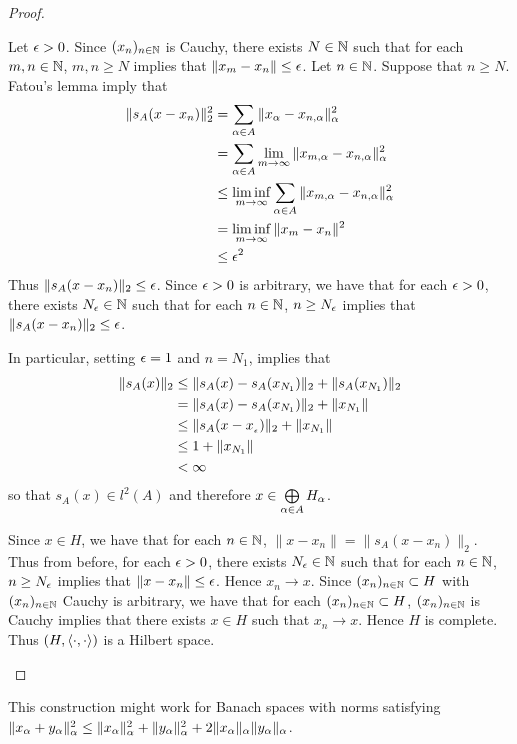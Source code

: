 \documentclass{book}
\begin{document}
\begin{proof}
\begin{enumerate}
		Let $\epsilon > 0$. Since $(x_n)_{n \in \mathbb{N}}$ is Cauchy, there exists $N \in \mathbb{N}$ such that for each $m,n \in \mathbb{N}$, $m,n \geq N$ implies that $\|x_m - x_n\| \leq \epsilon$. Let $n \in \mathbb{N}$. Suppose that $n \geq N$. Fatou's lemma imply that
		\begin{align*}
			\|s_A(x - x_n)\|_2^2 
			& = \sum_{\alpha \in A} \|x_{\alpha} - x_{n,\alpha}\|_{\alpha}^2 \\
			& = \sum_{\alpha \in A} \lim\limits_{m \rightarrow \infty} \|x_{m, \alpha} - x_{n,\alpha}\|_{\alpha}^2 \\
			& \leq \liminf\limits_{m \rightarrow \infty} \sum_{\alpha \in A} \|x_{m, \alpha} - x_{n,\alpha}\|_{\alpha}^2 \\
			& = \liminf\limits_{m \rightarrow \infty} \|x_m - x_n\|^2 \\
			& \leq \epsilon^2
		\end{align*}
		Thus $\|s_A(x - x_n)\|_2 \leq \epsilon$. Since $\epsilon > 0$ is arbitrary, we have that for each $\epsilon > 0$, there exists $N_{\epsilon} \in \mathbb{N}$ such that for each $n \in \mathbb{N}$, $n \geq N_{\epsilon}$ implies that $\|s_A(x - x_n)\|_2 \leq \epsilon$.
		
		In particular, setting $\epsilon = 1$ and $n = N_1$,  implies that
		\begin{align*}
			\|s_A(x)\|_2
			& \leq \|s_A(x) - s_A(x_{N_1})\|_2 + \|s_A(x_{N_1})\|_2 \\
			& = \|s_A(x) - s_A(x_{N_1})\|_2 + \|x_{N_1}\| \\
			& \leq \|s_A(x - x_{_{\epsilon}})\|_2 + \|x_{N_1}\| \\
			& \leq 1 + \|x_{N_1}\| \\
			& < \infty 
		\end{align*}
		so that $s_A(x) \in l^2(A)$ and therefore $x \in \bigoplus\limits_{\alpha \in A} H_{\alpha}$. 
		
		Since $x \in H$, we have that for each $n \in \mathbb{N}$, $\|x - x_n\| = \|s_A(x - x_n)\|_2$. Thus from before, for each $\epsilon > 0$, there exists $N_{\epsilon} \in \mathbb{N}$ such that for each $n \in \mathbb{N}$, $n \geq N_{\epsilon}$ implies that $\|x - x_n\| \leq \epsilon$. Hence $x_n \rightarrow x$. Since $(x_n)_{n \in \mathbb{N}} \subset H$ with $(x_n)_{n \in \mathbb{N}}$ Cauchy is arbitrary, we have that for each $(x_n)_{n \in \mathbb{N}} \subset H$, $(x_n)_{n \in \mathbb{N}}$ is Cauchy implies that there exists $x \in H$ such that $x_n \rightarrow x$. Hence $H$ is complete. Thus $(H, \langle \cdot, \cdot \rangle)$ is a Hilbert space.
	\end{enumerate}
\end{proof}

\begin{note}
	This construction might work for Banach spaces with norms satisfying $\|x_{\alpha}+y_{\alpha}\|_{\alpha}^2 \leq \|x_{\alpha}\|_{\alpha}^2 + \|y_{\alpha}\|_{\alpha}^2 + 2\|x_{\alpha}\|_{\alpha}\|y_{\alpha}\|_{\alpha}$.
\end{note}
\end{document}
